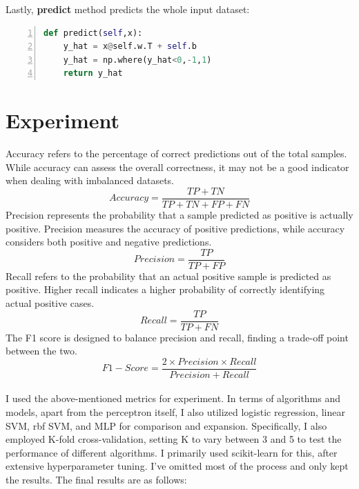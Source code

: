 \documentclass[10pt,twocolumn,letterpaper]{article}
\begin{document}
Lastly, \textbf{predict} method predicts the whole input dataset:
\begin{lstlisting}[language={python},numbers=left,tabsize=2]
def predict(self,x):
	y_hat = x@self.w.T + self.b
	y_hat = np.where(y_hat<0,-1,1)
	return y_hat
\end{lstlisting}

\section{Experiment}
Accuracy refers to the percentage of correct predictions out of the total samples. While accuracy can assess the overall correctness, it may not be a good indicator when dealing with imbalanced datasets.
\begin{equation}
	Accuracy = \frac{TP+TN}{TP+TN+FP+FN}
\end{equation}
\indent Precision represents the probability that a sample predicted as positive is actually positive. Precision measures the accuracy of positive predictions, while accuracy considers both positive and negative predictions.
\begin{equation}
	Precision = \frac{TP}{TP+FP}
\end{equation}
\indent Recall refers to the probability that an actual positive sample is predicted as positive. Higher recall indicates a higher probability of correctly identifying actual positive cases.
\begin{equation}
	Recall = \frac{TP}{TP+FN}
\end{equation}
\indent The F1 score is designed to balance precision and recall, finding a trade-off point between the two.
\begin{equation}
	F1-Score = \frac{2\times Precision\times Recall}{Precision+Recall}
\end{equation}
\\
\indent I used the above-mentioned metrics for experiment. In terms of algorithms and models, apart from the perceptron itself, I also utilized logistic regression, linear SVM, rbf SVM, and MLP for comparison and expansion.
Specifically, I also employed K-fold cross-validation, setting K to vary between 3 and 5 to test the performance of different algorithms. I primarily used scikit-learn for this, after extensive hyperparameter tuning. I've omitted most of the process and only kept the results. The final results are as follows:
~\\
~\\
\end{document}
